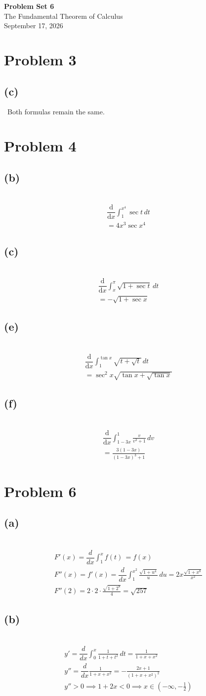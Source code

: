 \documentclass[12pt]{article}
\newcommand*{\deriv}[1][x]{\ensuremath{\dfrac{\mathrm{d}}{\mathrm{d}#1}}}
\newcommand{\ddx}{\dfrac{d}{dx}}
\newcommand{\vem}{\vspace{0.5em}}
\newcommand{\problem}[1]{\section{Problem #1}}
\newcommand{\subproblem}[1]{\subsection{(#1)} \,}
\begin{document}
\vspace*{0cm}

\begin{center}
    {\Large \bfseries Problem Set 6} \\[0.5cm]
    {\large The Fundamental Theorem of Calculus} \\[0.35cm]
    {\normalsize September 17, 2026}
\end{center}


\problem{3}

\subproblem{c}
Both formulas remain the same. \vem

\problem{4}

\subproblem{b}
\begin{gather*}
    \deriv  \int_1^{x^4} \sec t\, dt\\
    =\boxed{4x^3\sec x^4}
\end{gather*}

\subproblem{c}
\begin{gather*}
    \deriv \int_x^\pi{ \sqrt{1+\sec t}} \, dt\\
    = \boxed{- \sqrt{1+\sec x}}
\end{gather*}

\subproblem{e}
\begin{gather*}
    \deriv \int_1^{\tan x} \sqrt{t+\sqrt{t}} \, dt\\
    =\boxed{\sec ^2 x \sqrt{\tan x+\sqrt{\tan x}}}
\end{gather*}

\subproblem{f}
\begin{gather*}
    \deriv \int_{1-3x}^1 \frac{v}{v^3+1} \, dv\\
    =\boxed{\frac{3(1-3x)}{(1-3x)^3+1}}
\end{gather*}

\problem{6}

\subproblem{a}
\begin{gather*}
    F'(x)=\ddx \int_1^x f(t)\, =f(x)\\
    F''(x)=f'(x)= \ddx \int_1^{x^2} \frac{\sqrt{1+u^4}}{u} \, du =2x \frac{\sqrt{1+x^8}}{x^2}\\
    F''(2)=2\cdot 2 \cdot \frac{\sqrt{1+2^8}}{4}=\boxed{\sqrt{257}}
\end{gather*}

\subproblem{b}
\begin{gather*}
    y'=\ddx \int_0^x \frac{1}{1+t+t^2} \, dt= \frac{1}{1+x+x^2}\\
    y''=\ddx \frac{1}{1+x+x^2}=-\frac{2x+1}{(1+x+x^2)^2}\\
    y''>0 \implies 1+2x<0 \implies \boxed{x\in (-\infty , -\frac{1}{2})}
\end{gather*}
\end{document}
